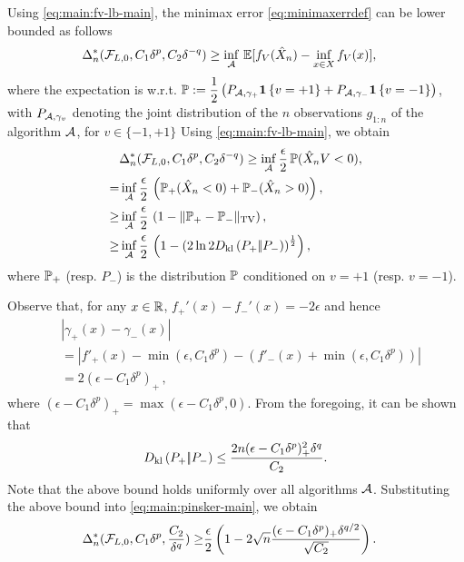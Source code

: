 Using \eqref{eq:main:fv-lb-main}, the minimax error \eqref{eq:minimaxerrdef} can be lower bounded as follows
\begin{align*}
\MoveEqLeft 
\Delta_n^*(\F_{L,0}, C_1 \delta^p ,C_2 \delta^{-q}) %
  \ge  \inf_{\A} \,  \E[f_V(\hat X_n) - \inf_{x \in X}
  f_V(x)],
  \end{align*}
where the expectation is w.r.t. $\P:= \dfrac{1}{2} \left(P_{\A, \gamma_+} \indic{v=+1} + P_{\A, \gamma_-}\indic{v=-1}\right)$, with $P_{\A,\gamma_v}$ denoting the joint distribution of the $n$ observations $g_{1:n}$ of the algorithm $\A$, for $v \in \{-1,+1\}$
Using \eqref{eq:main:fv-lb-main}, we obtain
\begin{align}
&\Delta_n^*(\F_{L,0}, C_1 \delta^p ,C_2 \delta^{-q})  \ge  \inf_{\A} \dfrac{\epsilon}{2}\,  \P(\hat X_n V < 0), \label{eq:main:strong-convex-bd}\\
  = & \inf_{\A} \dfrac{\epsilon }{2} \, \left(\P_{+}(\hat X_n < 0) + \P_{-}(\hat X_n > 0)\right), \label{eq:main:Pplus}\\
  \ge &\inf_{\A} \dfrac{\epsilon }{2} \,\left(1 - \tvnorm{\P_{+}- \P_{-}}\right), \label{eq:main:lecam}\\
  \ge &\inf_{\A} \dfrac{\epsilon }{2}  \,\left( 1 - \left(2\ln 2\dkl{P_{+}}{P_{-}}\right)^{\frac{1}{2}}\right), \label{eq:main:pinsker-main}
\end{align}
where $\P_{+}$ (resp. $P_-$) is the distribution $\P$ conditioned on $v=+1$ (resp. $v=-1$).

Observe that, for any $x\in \R$, $f_+'(x) - f_-'(x) = -2\epsilon$ and hence
\begin{align}
& |\gamma_+(x) - \gamma_-(x)| \nonumber\\
& = | f'_+(x) - \min(\epsilon,C_1 \delta^p) - (f'_-(x)+\min(\epsilon,C_1 \delta^p)) | \nonumber \\
& = 2 (\epsilon - C_1 \delta^p)_+\,,
 \label{eq:main:gdiff-ub}
\end{align}
where $(\epsilon - C_1 \delta^p)_+ = \max(\epsilon - C_1 \delta^p,0)$. 
From the foregoing, it can be shown that 
\begin{align}
\dkl{P_{+}}{P_{-}} \le \dfrac{2n(\epsilon-C_1\delta^p)_+^2 \delta^q}{C_2}.\label{eq:main:dkbd-main}
\end{align}
Note that the above bound holds uniformly over all algorithms $\A$. 
Substituting the above bound into \eqref{eq:main:pinsker-main}, we obtain 
\begin{align*}
 \Delta_n^*(\F_{L,0}, C_1 \delta^p ,\frac{C_2}{\delta^{q}})
  \ge & \frac{\epsilon}{2} \left(1 - 2\sqrt{
    n}  \frac{(\epsilon-C_1\delta^p)_+\delta^{q/2}}{\sqrt{C_2}}
  \right).\label{eq:main:final-lower-bd}
\end{align*}

